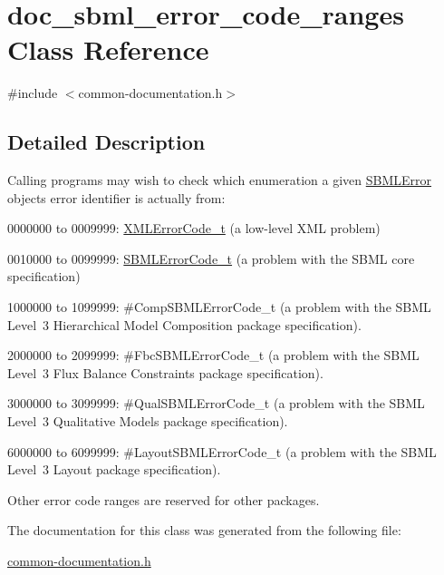 \hypertarget{classdoc__sbml__error__code__ranges}{}\section{doc\+\_\+sbml\+\_\+error\+\_\+code\+\_\+ranges Class Reference}
\label{classdoc__sbml__error__code__ranges}


{\ttfamily \#include $<$common-\/documentation.\+h$>$}



\subsection{Detailed Description}
\begin{DoxyParagraph}{}
Calling programs may wish to check which enumeration a given \hyperlink{class_s_b_m_l_error}{S\+B\+M\+L\+Error} object\textquotesingle{}s error identifier is actually from\+: \begin{DoxyItemize}
\item 0000000 to 0009999\+: \hyperlink{_x_m_l_error_8h_a5ff7604587bd93fb60cdecb72acd160c}{X\+M\+L\+Error\+Code\+\_\+t} (a low-\/level X\+ML problem)\end{DoxyItemize}
\begin{DoxyItemize}
\item 0010000 to 0099999\+: \hyperlink{_s_b_m_l_error_8h_a64521d2629dd339aea5b194d546c3627}{S\+B\+M\+L\+Error\+Code\+\_\+t} (a problem with the S\+B\+ML core specification) \item 1000000 to 1099999\+: \#\+Comp\+S\+B\+M\+L\+Error\+Code\+\_\+t (a problem with the S\+B\+ML Level~3 Hierarchical Model Composition package specification).\end{DoxyItemize}
\begin{DoxyItemize}
\item 2000000 to 2099999\+: \#\+Fbc\+S\+B\+M\+L\+Error\+Code\+\_\+t (a problem with the S\+B\+ML Level~3 Flux Balance Constraints package specification).\end{DoxyItemize}
\begin{DoxyItemize}
\item 3000000 to 3099999\+: \#\+Qual\+S\+B\+M\+L\+Error\+Code\+\_\+t (a problem with the S\+B\+ML Level~3 Qualitative Models package specification).\end{DoxyItemize}
\begin{DoxyItemize}
\item 6000000 to 6099999\+: \#\+Layout\+S\+B\+M\+L\+Error\+Code\+\_\+t (a problem with the S\+B\+ML Level~3 Layout package specification).\end{DoxyItemize}
Other error code ranges are reserved for other packages. 
\end{DoxyParagraph}


The documentation for this class was generated from the following file\+:\begin{DoxyCompactItemize}
\item 
\hyperlink{common-documentation_8h}{common-\/documentation.\+h}\end{DoxyCompactItemize}
